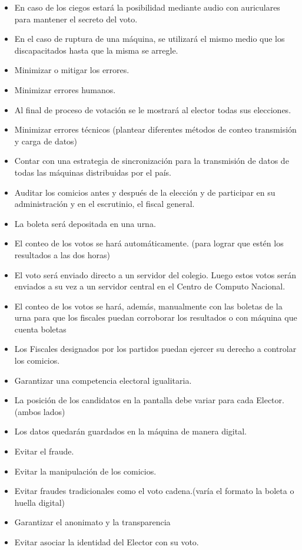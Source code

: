 \documentclass[spanish, 10pt,a4paper]{article}
\numberwithin{equation}{section} %
\begin{document}
\begin{itemize}
\item En caso de los ciegos estará la posibilidad mediante audio con auriculares para mantener el secreto del voto.
\item En el caso de ruptura de una máquina, se utilizará el mismo medio que los discapacitados hasta que la misma se arregle.
\item Minimizar o mitigar los errores.
\item Minimizar errores humanos.
\item Al final de proceso de votación se le mostrará al elector todas sus elecciones.
\item Minimizar errores técnicos (plantear diferentes métodos de conteo transmisión y carga de datos)
\item Contar con una estrategia de sincronización para la transmisión de datos de todas las máquinas distribuidas por el país.
\item Auditar los comicios antes y después de la elección y de participar en su administración y en el escrutinio, el fiscal general.
\item La boleta será depositada en una urna. 
\item El conteo de los votos se hará automáticamente. (para lograr que estén los resultados a las dos horas)
\item El voto será enviado directo a un servidor del colegio. Luego estos votos serán enviados a su vez a un servidor central en el Centro de Computo Nacional. 
\item El conteo de los votos se hará, además, manualmente con las boletas de la urna para que los fiscales puedan corroborar los resultados o con máquina que cuenta boletas
\item Los Fiscales designados por los partidos puedan ejercer su derecho a controlar los comicios.
\item Garantizar una competencia electoral igualitaria.
\item La posición de los candidatos en la pantalla debe variar para cada Elector. (ambos lados)
\item Los datos quedarán guardados en la máquina de manera digital.
\item Evitar el fraude.
\item Evitar la manipulación de los comicios.
\item Evitar fraudes tradicionales como el voto cadena.(varía el formato la boleta o huella digital)
\item Garantizar el anonimato y la transparencia
\item Evitar asociar la identidad del Elector con su voto.

\end{itemize}
\end{document}
